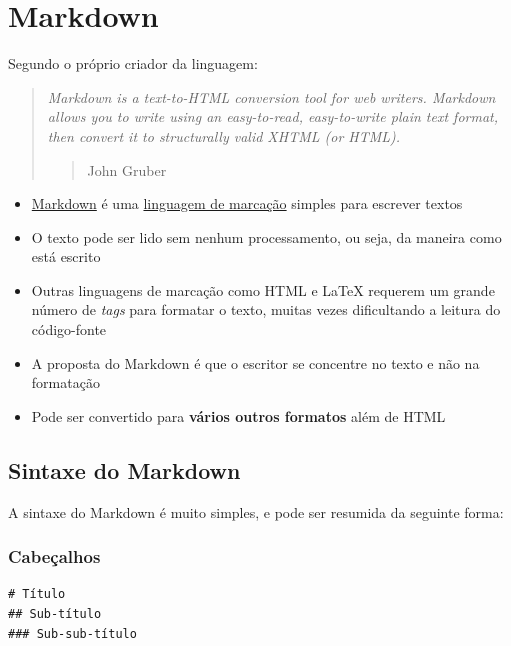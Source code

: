 \documentclass[10pt,a4paper]{book}
\providecommand{\tightlist}{%
  \setlength{\itemsep}{0pt}\setlength{\parskip}{0pt}}
\begin{document}
\section{Markdown}\label{markdown}

Segundo o próprio criador da linguagem:

\begin{quote}
\emph{Markdown is a text-to-HTML conversion tool for web writers.
Markdown allows you to write using an easy-to-read, easy-to-write plain
text format, then convert it to structurally valid XHTML (or HTML).}

\begin{quote}
John Gruber
\end{quote}
\end{quote}

\begin{itemize}
\tightlist
\item
  \href{http://daringfireball.net/projects/markdown}{Markdown} é uma
  \href{https://pt.wikipedia.org/wiki/Linguagem_de_marcação/}{linguagem
  de marcação} simples para escrever textos
\item
  O texto pode ser lido sem nenhum processamento, ou seja, da maneira
  como está escrito
\item
  Outras linguagens de marcação como HTML e LaTeX requerem um grande
  número de \emph{tags} para formatar o texto, muitas vezes dificultando
  a leitura do código-fonte
\item
  A proposta do Markdown é que o escritor se concentre no texto e não na
  formatação
\item
  Pode ser convertido para \textbf{vários outros formatos} além de HTML
\end{itemize}

\subsection{Sintaxe do Markdown}\label{sintaxe-do-markdown}

A sintaxe do Markdown é muito simples, e pode ser resumida da seguinte
forma:

\subsubsection*{Cabeçalhos}\label{cabecalhos}


\begin{verbatim}
# Título
## Sub-título
### Sub-sub-título
\end{verbatim}
\end{document}
